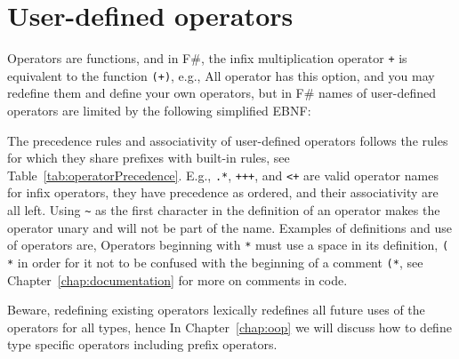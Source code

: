 \section{User-defined operators}
\label{sec:operators}
Operators are functions, and in F\#, the infix multiplication operator \lstinline!+! is equivalent to the function \lstinline!(+)!, e.g.,
%
%
All operator has this option, and you may redefine them and define your own operators, but in F\# names of user-defined operators are limited by the following simplified EBNF:
The precedence rules and associativity of user-defined operators follows the rules for which they share prefixes with built-in rules, see Table~\ref{tab:operatorPrecedence}. E.g., \lstinline!.*!, \lstinline!+++!, and \lstinline!<+! are valid operator names for infix operators, they have precedence as ordered, and their associativity are all left. Using \lstinline!~! as the first character in the definition of an operator makes the operator unary and will not be part of the name. Examples of definitions and use of operators are,
%
%
Operators beginning with \lstinline!*! must use a space in its definition, \lstinline!( *! in order for it not to be confused with the beginning of a comment \lstinline!(*!, see Chapter~\ref{chap:documentation} for more on comments in code.

Beware, redefining existing operators lexically redefines all future uses of the operators for all types, hence  In Chapter~\ref{chap:oop} we will discuss how to define type specific operators including prefix operators. 

